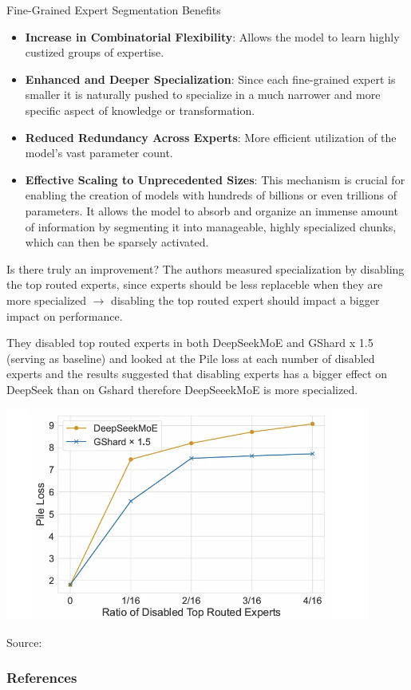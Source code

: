 \documentclass{beamer}
\begin{document}
\begin{frame}{Fine-Grained Expert Segmentation Benefits}
  \begin{itemize}
    \item \textbf{Increase in Combinatorial Flexibility}: Allows the model to learn highly custized groups of expertise.
    \item \textbf{Enhanced and Deeper Specialization}: Since each fine-grained expert is smaller it is naturally pushed to specialize 
    in a much narrower and more specific aspect of knowledge or transformation.
    \item \textbf{Reduced Redundancy Across Experts}: More efficient utilization of the model's vast parameter count.
    \item \textbf{Effective Scaling to Unprecedented Sizes}: This mechanism is crucial for enabling the creation of models with hundreds of billions or even trillions of parameters. It allows the model to absorb and organize an immense amount of information by segmenting it into manageable, 
    highly specialized chunks, which can then be sparsely activated.
  \end{itemize}
  \cite{dai2024deepseekmoe} \cite{gopubby_deepseekv3}
\end{frame}


\begin{frame}{Is there truly an improvement?}
  The authors measured specialization by disabling the top routed experts, since experts should be less
  replaceble when they are more specialized $\rightarrow$ disabling the top routed expert should impact a bigger
  impact on performance.

  They disabled top routed experts in both DeepSeekMoE and GShard x 1.5 (serving as baseline) and looked at the 
  Pile loss at each number of disabled experts and the results suggested that disabling experts has a bigger
  effect on DeepSeek than on Gshard therefore DeepSeeekMoE is more specialized. \cite{dai2024deepseekmoe} \cite{gopubby_deepseekv3}
  
\end{frame}


\begin{frame}
  \begin{center}
        \includegraphics[width=0.9\textwidth]{pile.png}
        \par
        \small Source:  \cite{dai2024deepseekmoe}
    \end{center}
\end{frame}


\begin{frame}[allowframebreaks]
    \frametitle{References}
    \printbibliography
\end{frame}
\end{document}
